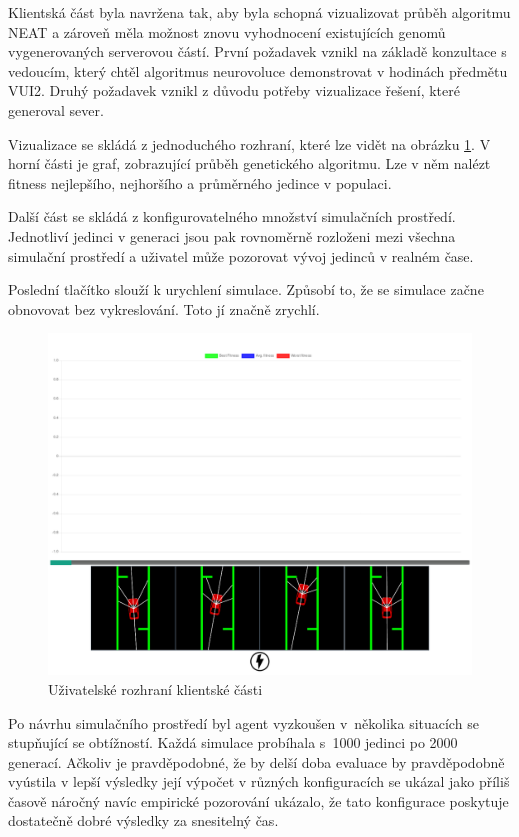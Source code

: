 

Klientská část byla navržena tak, aby byla schopná vizualizovat průběh algoritmu NEAT a zároveň měla možnost znovu vyhodnocení existujících genomů vygenerovaných serverovou částí. První požadavek vznikl na základě konzultace s vedoucím, který chtěl algoritmus neurovoluce demonstrovat v hodinách předmětu VUI2. Druhý požadavek vznikl z důvodu potřeby vizualizace řešení, které generoval sever.

Vizualizace se skládá z jednoduchého rozhraní, které lze vidět na obrázku \ref{fig:visualization}. V horní části je graf, zobrazující průběh genetického algoritmu. Lze v něm nalézt fitness nejlepšího, nejhoršího a průměrného jedince v populaci.

Další část se skládá z konfigurovatelného množství simulačních prostředí. Jednotliví jedinci v generaci jsou pak rovnoměrně rozloženi mezi všechna simulační prostředí a uživatel může pozorovat vývoj jedinců v realném čase.

Poslední tlačítko slouží k urychlení simulace. Způsobí to, že se simulace začne obnovovat bez vykreslování. Toto jí značně zrychlí.

\begin{figure}[h!]
	\centering
	\includegraphics[width=0.6\linewidth]{visualization}
	\caption{Uživatelské rozhraní klientské části}
	\label{fig:visualization}
\end{figure}


Po návrhu simulačního prostředí byl agent vyzkoušen v~několika situacích se stupňující se obtížností. Každá simulace probíhala s~1000 jedinci po 2000 generací. Ačkoliv je pravděpodobné, že by delší doba evaluace by pravděpodobně vyústila v lepší výsledky její výpočet v různých konfiguracích se ukázal jako příliš časově náročný navíc empirické pozorování ukázalo, že tato konfigurace poskytuje dostatečně dobré výsledky za snesitelný čas. 

